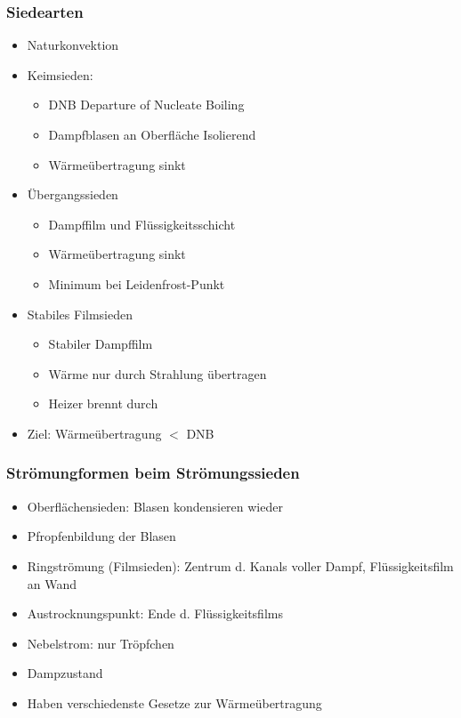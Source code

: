 \documentclass[12pt]{article}
\begin{document}
\subsubsection{Siedearten}
\begin{itemize}[noitemsep]
	\item Naturkonvektion
	\item Keimsieden:
		\begin{itemize}[noitemsep]
			\item DNB \textrightarrow Departure of Nucleate Boiling
			\item Dampfblasen an Oberfläche \textrightarrow Isolierend
			\item Wärmeübertragung sinkt
		\end{itemize}
	\item Übergangssieden
		\begin{itemize}[noitemsep]
			\item Dampffilm und Flüssigkeitsschicht
			\item Wärmeübertragung sinkt
			\item Minimum bei Leidenfrost-Punkt
		\end{itemize}
	\item Stabiles Filmsieden
		\begin{itemize}[noitemsep]
			\item Stabiler Dampffilm
			\item Wärme nur durch Strahlung übertragen
			\item Heizer brennt durch
		\end{itemize}
	\item Ziel: Wärmeübertragung \(<\) DNB
\end{itemize}

\subsubsection{Strömungformen beim Strömungssieden}
\begin{itemize}[noitemsep]
	\item Oberflächensieden: Blasen kondensieren wieder
	\item Pfropfenbildung der Blasen
	\item Ringströmung (Filmsieden): Zentrum d. Kanals voller Dampf, Flüssigkeitsfilm an Wand
	\item Austrocknungspunkt: Ende d. Flüssigkeitsfilms
	\item Nebelstrom: nur Tröpfchen
	\item Dampzustand
	\item Haben verschiedenste Gesetze zur Wärmeübertragung
\end{itemize}
\end{document}
